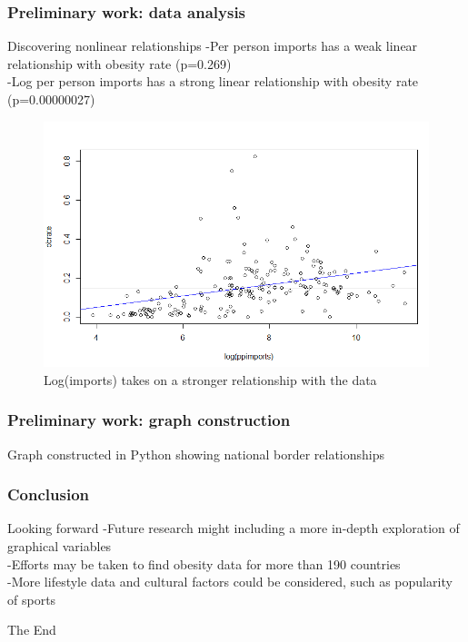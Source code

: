 \documentclass{beamer}
\begin{document}
\begin{frame}
\frametitle{Preliminary work: data analysis}
\begin{block}
{Discovering nonlinear relationships}
-Per person imports has a weak linear relationship with obesity rate (p=0.269)
\\
-Log per person imports has a strong linear relationship with obesity rate (p=0.00000027)
\end{block}

\begin{figure}
\label{fig:logs}
\caption{Log(imports) takes on a stronger relationship with the data}
\centering
\includegraphics[scale=0.4]{ppimports_log.PNG}
\end{figure}
\end{frame}

\begin{frame}
\frametitle{Preliminary work: graph construction}
Graph constructed in Python showing national border relationships
\end{frame}

\begin{frame}
\frametitle{Conclusion}
\begin{block}
{Looking forward}
-Future research might including a more in-depth exploration of graphical variables
\\
-Efforts may be taken to find obesity data for more than 190 countries
\\
-More lifestyle data and cultural factors could be considered, such as popularity of sports
\end{block}
\end{frame}
 
\begin{frame}
\centerline{The End}
\end{frame}
\end{document}
